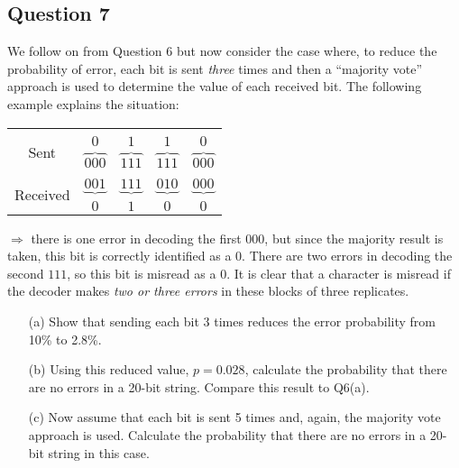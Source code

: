 \subsection*{Question 7}
We follow on from Question 6 but now consider the case where, to reduce the probability of error, each bit is sent \emph{three} times and then a ``majority vote'' approach is used to determine the value of each received bit. The following example explains the situation:\\[-0.5cm]
\begin{center}
\begin{tabular}{ccccc}
\hline
&&&&\\[-0.3cm]
\multirow{2}{*}{Sent} & $0$ & $1$ & $1$ & $0$ \\
& $\overbrace{000}$ & $\overbrace{111}$ & $\overbrace{111}$ & $\overbrace{000}$ \\[0.2cm]
\hline
&&&&\\[-0.3cm]
\multirow{2}{*}{Received} & $\underbrace{001}$ & $\underbrace{111}$ & $\underbrace{010}$ & $\underbrace{000}$ \\
& $0$ & $1$ & $0$ & $0$ \\[0.2cm]
\hline
\end{tabular}
\end{center}
$\Rightarrow$ there is one error in decoding the first $000$, but since the majority result is taken, this bit is correctly identified as a $0$. There are two errors in decoding the second $111$, so this bit is misread as a $0$. It is clear that a character is misread if the decoder makes \emph{two or three errors} in these blocks of three replicates.\\[-0.2cm]
\begin{itemize}
\item[(a)] Show that sending each bit 3 times reduces the error probability from 10\% to 2.8\%. \\ \item[(b)] Using this reduced value, $p=0.028$, calculate the probability that there are no errors in a 20-bit string. Compare this result to Q6(a).  \item[(c)] Now assume that each bit is sent 5 times and, again, the majority vote approach is used. Calculate the probability that there are no errors in a 20-bit string in this case. %
\end{itemize}



